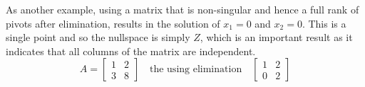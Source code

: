             \par \hfill \break
            As another example, using a matrix that is non-singular and hence a full rank of pivots after elimination, 
            results in the solution of \(x_1=0\) and \(x_2=0\). This is a single point and so the nullspace is simply 
            \(Z\), which is an important result as it indicates that all columns of the matrix are independent.
            \begin{equation}
                A = 
                \begin{bmatrix}
                    1 & 2 \\
                    3 & 8
                \end{bmatrix}
                \quad \textrm{the using elimination} \quad
                \begin{bmatrix}
                    1 & 2 \\
                    0 & 2
                \end{bmatrix}
            \end{equation}

